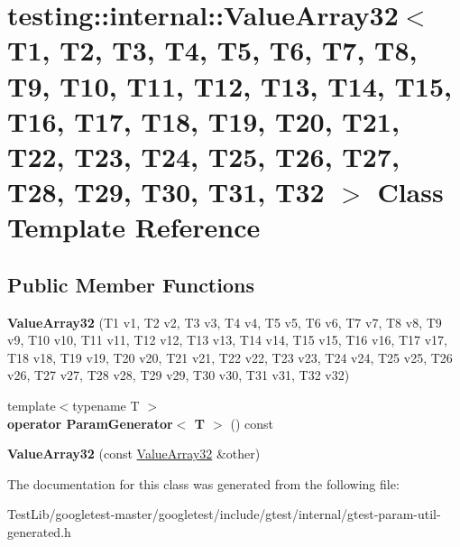 \hypertarget{classtesting_1_1internal_1_1ValueArray32}{}\section{testing\+:\+:internal\+:\+:Value\+Array32$<$ T1, T2, T3, T4, T5, T6, T7, T8, T9, T10, T11, T12, T13, T14, T15, T16, T17, T18, T19, T20, T21, T22, T23, T24, T25, T26, T27, T28, T29, T30, T31, T32 $>$ Class Template Reference}
\label{classtesting_1_1internal_1_1ValueArray32}
\subsection*{Public Member Functions}
\begin{DoxyCompactItemize}
\item 
\mbox{\label{classtesting_1_1internal_1_1ValueArray32_ad5b6e2ff644e170bda8bf67ef8283c5a}} 
{\bfseries Value\+Array32} (T1 v1, T2 v2, T3 v3, T4 v4, T5 v5, T6 v6, T7 v7, T8 v8, T9 v9, T10 v10, T11 v11, T12 v12, T13 v13, T14 v14, T15 v15, T16 v16, T17 v17, T18 v18, T19 v19, T20 v20, T21 v21, T22 v22, T23 v23, T24 v24, T25 v25, T26 v26, T27 v27, T28 v28, T29 v29, T30 v30, T31 v31, T32 v32)
\item 
\mbox{\label{classtesting_1_1internal_1_1ValueArray32_a03c8932477b8fe28b2800393a23e4e13}} 
{\footnotesize template$<$typename T $>$ }\\{\bfseries operator Param\+Generator$<$ T $>$} () const
\item 
\mbox{\label{classtesting_1_1internal_1_1ValueArray32_aa64bff75279681235a4289e49ca9c2aa}} 
{\bfseries Value\+Array32} (const \hyperlink{classtesting_1_1internal_1_1ValueArray32}{Value\+Array32} \&other)
\end{DoxyCompactItemize}


The documentation for this class was generated from the following file\+:\begin{DoxyCompactItemize}
\item 
Test\+Lib/googletest-\/master/googletest/include/gtest/internal/gtest-\/param-\/util-\/generated.\+h\end{DoxyCompactItemize}

